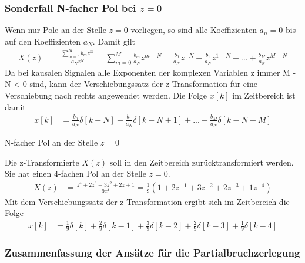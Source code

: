\subsubsection{Sonderfall N-facher Pol bei \(z = 0\)}\label{sec:sonderfall-n-facher-pol-bei-z-0}

Wenn nur Pole an der Stelle \(z = 0\) vorliegen, so sind alle Koeffizienten \(a_{n} = 0\) bis auf den Koeffizienten \(a_{N}\). Damit gilt
\begin{align}
X(z) &= \frac{\sum\limits_{m = 0}^{M}{b_{m}  z^{m}}}{a_{N}  z^{N}} = \sum\limits_{m = 0}^{M}{\frac{b_{m}}{a_{N}}  z^{m - N}} = \frac{b_{0}}{a_{N}}  z^{- N} + \frac{b_{1}}{a_{N}}  z^{1 - N} + ... + \frac{b_{M}}{a_{N}}  z^{M - N} \label{eq:5.116}
\end{align}
Da bei kausalen Signalen alle Exponenten der komplexen Variablen z immer M - N \textless{} 0 sind, kann der Verschiebungssatz der z-Transformation für eine Verschiebung nach rechts angewendet werden. Die Folge \(x[k]\) im Zeitbereich ist damit
\begin{align}
x[ k] &= \frac{b_{0}}{a_{N}}  \delta[ k - N] + \frac{b_{1}}{a_{N}}  \delta[ k - N + 1] + ... + \frac{b_{M}}{a_{N}}  \delta[ k - N + M] \label{eq:5.117}
\end{align}
\begin{example}{N-facher Pol an der Stelle \(z = 0\)}
\label{example:beispiel-n-facher-pol-an-der-stelle-z-0}

Die z-Transformierte \(X(z)\) soll in den Zeitbereich zurücktransformiert werden. Sie hat einen 4-fachen Pol an der Stelle \(z = 0\).
\begin{align*}
X(z) &= \frac{z^{4} + 2  z^{3} + 3  z^{2} + 2  z + 1}{9  z^{4}} = \frac{1}{9}  \left( 1 + 2  z^{- 1} + 3  z^{- 2} + 2  z^{- 3} + 1  z^{- 4} \right) 
\end{align*}
Mit dem Verschiebungssatz der z-Transformation ergibt sich im Zeitbereich die Folge
\begin{align*}
x[ k] &= \frac{1}{9}  \delta[ k] + \frac{2}{9}  \delta[ k - 1] + \frac{3}{9}  \delta[ k - 2] + \frac{2}{9}  \delta[ k - 3] + \frac{1}{9}  \delta[ k - 4] 
\end{align*}
\end{example}

\subsubsection{Zusammenfassung der Ansätze für die Partialbruchzerlegung}\label{sec:zusammenfassung-der-ansuxe4tze-fuxfcr-die-partialbruchzerlegung}

